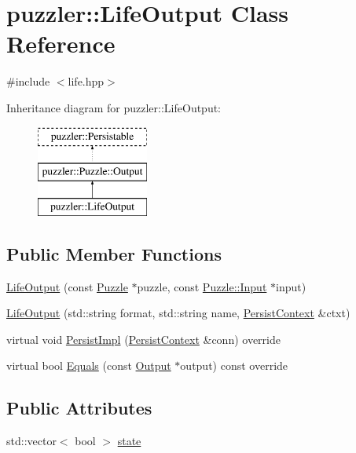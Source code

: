 \hypertarget{a00011}{}\section{puzzler\+:\+:Life\+Output Class Reference}
\label{a00011}


{\ttfamily \#include $<$life.\+hpp$>$}

Inheritance diagram for puzzler\+:\+:Life\+Output\+:\begin{figure}[H]
\begin{center}
\leavevmode
\includegraphics[height=3.000000cm]{a00011}
\end{center}
\end{figure}
\subsection*{Public Member Functions}
\begin{DoxyCompactItemize}
\item 
\hyperlink{a00011_a71c80815ebf258f53e0475fe1a7a9fb9}{Life\+Output} (const \hyperlink{a00026}{Puzzle} $\ast$puzzle, const \hyperlink{a00009}{Puzzle\+::\+Input} $\ast$input)
\item 
\hyperlink{a00011_a17407810d97dd22c92eaa02fec330cfd}{Life\+Output} (std\+::string format, std\+::string name, \hyperlink{a00025}{Persist\+Context} \&ctxt)
\item 
virtual void \hyperlink{a00011_ae48d78e050fda5544ba2be126df8e935}{Persist\+Impl} (\hyperlink{a00025}{Persist\+Context} \&conn) override
\item 
virtual bool \hyperlink{a00011_ab297f61abe511ad2f4e92376f66f9246}{Equals} (const \hyperlink{a00023_aa605318d3632c1b359c07745bdf17e83}{Output} $\ast$output) const override
\end{DoxyCompactItemize}
\subsection*{Public Attributes}
\begin{DoxyCompactItemize}
\item 
std\+::vector$<$ bool $>$ \hyperlink{a00011_a305502dbf2764a90c34f3fa64c708d52}{state}
\end{DoxyCompactItemize}

